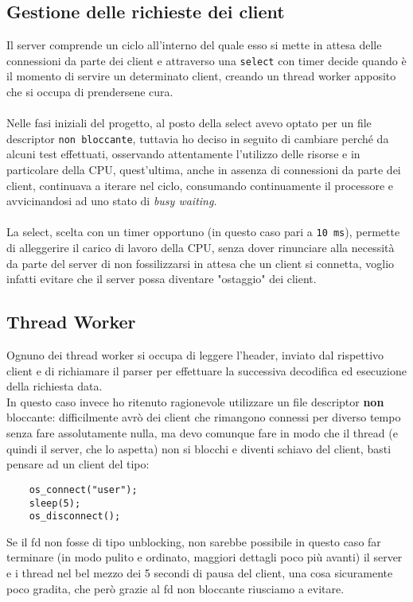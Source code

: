 \subsection{Gestione delle richieste dei client}
\begin{flushleft}
Il server comprende un ciclo all'interno del quale esso si mette in attesa delle connessioni da parte dei client e attraverso una \texttt{select} con timer decide quando è il momento di servire un determinato client, creando un thread worker apposito che si occupa di prendersene cura.
\\~\\
Nelle fasi iniziali del progetto, al posto della select avevo optato per un file descriptor \texttt{non bloccante}, tuttavia ho deciso in seguito di cambiare perché da alcuni test effettuati, osservando attentamente l'utilizzo delle risorse e in particolare della CPU, quest'ultima, anche in assenza di connessioni da parte dei client, continuava a iterare nel ciclo, consumando continuamente il processore e avvicinandosi ad uno stato di \emph{busy waiting}.
\\~\\
La select, scelta con un timer opportuno (in questo caso pari a \texttt{10 ms}), permette di alleggerire il carico di lavoro della CPU, senza dover rinunciare alla necessità da parte del server di non fossilizzarsi in attesa che un client si connetta, voglio infatti evitare che il server possa diventare "ostaggio" dei client.
\end{flushleft}


\vspace{2mm}

\subsection{Thread Worker}
\begin{flushleft}
Ognuno dei thread worker si occupa di leggere l'header, inviato dal rispettivo client e di richiamare il parser per effettuare la successiva decodifica ed esecuzione della richiesta data.\\
In questo caso invece ho ritenuto ragionevole utilizzare un file descriptor \textbf{non} bloccante: difficilmente avrò dei client che rimangono connessi per diverso tempo senza fare assolutamente nulla, ma devo comunque fare in modo che il thread (e quindi il server, che lo aspetta) non si blocchi e diventi schiavo del client, basti pensare ad un client del tipo:

\begin{Verbatim} 
	os_connect("user");
	sleep(5);
	os_disconnect();
\end{Verbatim}

Se il fd non fosse di tipo unblocking, non sarebbe possibile in questo caso far terminare (in modo pulito e ordinato, maggiori dettagli poco più avanti) il server e i thread nel bel mezzo dei 5 secondi di pausa del client, una cosa sicuramente poco gradita, che però grazie al fd non bloccante riusciamo a evitare.

\end{flushleft}

